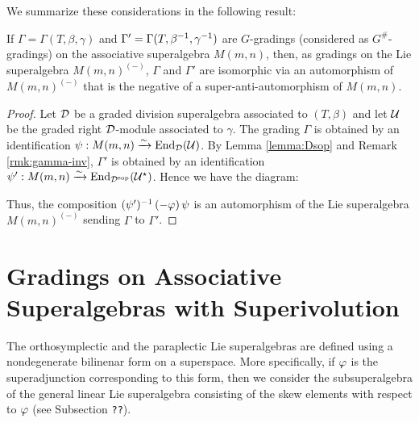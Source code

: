 \documentclass{amsbook}
\begin{document}
We summarize these considerations in the following result:

\begin{lemma}\label{lemma:iso-inv}
	If $\Gamma = \Gamma(T,\beta,\gamma)$ and $\Gamma' = \Gamma(T,\beta^{-1},\gamma^{-1})$ are $G$-gradings (considered as $G^\#$-gradings) on the associative superalgebra $M(m,n)$, then, as gradings on the Lie superalgebra $M(m,n)^{(-)}$, $\Gamma$ and $\Gamma'$ are isomorphic via an automorphism of $M(m,n)^{(-)}$ that is the negative of a super-anti-automorphism of 	$M(m,n)$.
\end{lemma}

\begin{proof}
	Let $\mathcal{D}$ be a graded division superalgebra associated to $(T,\beta)$ and let $\mathcal U$ be the graded right $\mathcal{D}$-module associated to $\gamma$. The grading $\Gamma$ is obtained by an identification $\psi: M(m, n) \xrightarrow{\sim} \operatorname{End}_{\mathcal{D}} (\mathcal U)$. By Lemma \ref{lemma:Dsop} and Remark \ref{rmk:gamma-inv}, $\Gamma'$ is obtained by an identification $\psi': M(m, n) \xrightarrow{\sim} \operatorname{End}_{\mathcal{D}^{\mathrm{sop}}} (\mathcal U^\star)$. Hence we have the diagram:

	\begin{center}
	\end{center}

	Thus, the composition $(\psi')^{-1} \, (-\varphi) \, \psi$ is an automorphism of the Lie superalgebra $M(m,n)^{(-)}$ sending $\Gamma$ to $\Gamma'$.
\end{proof}

\setcounter{chapter}{3}

\chapter{Gradings on Associative Superalgebras with Superivolution}

The orthosymplectic and the paraplectic Lie superalgebras are defined using a nondegenerate bilinenar form on a superspace. 
More specifically, if $\varphi$ is the superadjunction corresponding to this form, then we consider the subsuperalgebra of the general linear Lie superalgebra consisting of the skew elements with respect to $\varphi$ (see Subsection {\tt ??}). 
\end{document}

